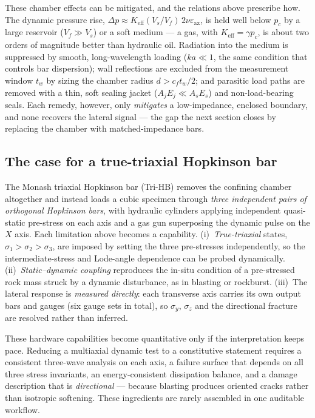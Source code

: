 \documentclass[sn-basic]{sn-jnl}
\begin{document}
These chamber effects can be mitigated, and the relations above prescribe how.
The dynamic pressure rise, $\Delta p\approx K_{\mathrm{eff}}(V_s/V_f)\,2\nu\varepsilon_{\mathrm{ax}}$,
is held well below $p_c$ by a large reservoir ($V_f\gg V_s$) or a soft medium ---
a gas, with $K_{\mathrm{eff}}=\gamma p_c$, is about two orders of magnitude better
than hydraulic oil. Radiation into the medium is suppressed by smooth, long-wavelength
loading ($ka\ll1$, the same condition that controls bar dispersion); wall
reflections are excluded from the measurement window $t_w$ by sizing the chamber
radius $d>c_f t_w/2$; and parasitic load paths are removed with a thin, soft
sealing jacket ($A_jE_j\ll A_sE_s$) and non-load-bearing seals. Each remedy,
however, only \emph{mitigates} a low-impedance, enclosed boundary, and none
recovers the lateral signal --- the gap the next section closes by replacing the
chamber with matched-impedance bars.

\subsection{The case for a true-triaxial Hopkinson bar}

The Monash triaxial Hopkinson bar (Tri-HB) removes the confining chamber
altogether and instead loads a cubic specimen through \emph{three independent
pairs of orthogonal Hopkinson bars}, with hydraulic cylinders applying
independent quasi-static pre-stress on each axis and a gas gun superposing the
dynamic pulse on the $X$ axis. Each limitation above becomes a capability.
(i)~\emph{True-triaxial} states, $\sigma_1>\sigma_2>\sigma_3$, are imposed by
setting the three pre-stresses independently, so the intermediate-stress and
Lode-angle dependence can be probed dynamically. (ii)~\emph{Static--dynamic
coupling} reproduces the in-situ condition of a pre-stressed rock mass struck by a
dynamic disturbance, as in blasting or rockburst. (iii)~The lateral response is
\emph{measured directly}: each transverse axis carries its own output bars and
gauges (six gauge sets in total), so $\sigma_y$, $\sigma_z$ and the directional
fracture are resolved rather than inferred.

These hardware capabilities become quantitative only if the interpretation keeps
pace. Reducing a multiaxial dynamic test to a constitutive statement requires a
consistent three-wave analysis on each axis, a failure surface that depends on all
three stress invariants, an energy-consistent dissipation balance, and a
damage description that is \emph{directional} --- because blasting produces
oriented cracks rather than isotropic softening. These ingredients are rarely
assembled in one auditable workflow.
\end{document}
